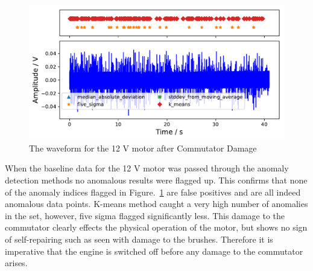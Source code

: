\begin{figure}[t]
    \includegraphics[width=1.0\textwidth]{fig/12V_hammer_motornorm12V.pdf}
    \caption[Anomaly Tests 12 V Commutator Damage]{The waveform for the 12 V motor after Commutator Damage}
    \label{fig:12V_Hammer}
\end{figure}

When the baseline data for the 12 V motor was passed through the anomaly detection methods no anomalous results were flagged up. This confirms that none of the anomaly indices flagged in Figure.~\ref{fig:12V_Hammer} are false positives and are all indeed anomalous data points. K-means method caught a very high number of anomalies in the set, however, five sigma flagged significantly less. This damage to the commutator clearly effects the physical operation of the motor, but shows no sign of self-repairing such as seen with damage to the brushes. Therefore it is imperative that the engine is switched off before any damage to the commutator arises.

